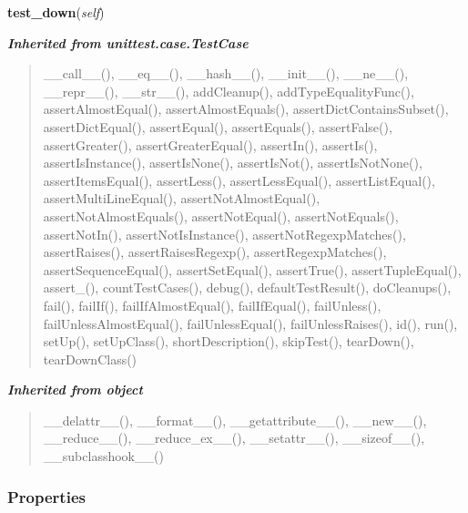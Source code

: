     \vspace{0.5ex}

\hspace{.8\funcindent}\begin{boxedminipage}{\funcwidth}

    \raggedright \textbf{test\_down}(\textit{self})

\setlength{\parskip}{2ex}
\setlength{\parskip}{1ex}
    \end{boxedminipage}


\large{\textbf{\textit{Inherited from unittest.case.TestCase}}}

\begin{quote}
\_\_call\_\_(), \_\_eq\_\_(), \_\_hash\_\_(), \_\_init\_\_(), \_\_ne\_\_(), \_\_repr\_\_(), \_\_str\_\_(), addCleanup(), addTypeEqualityFunc(), assertAlmostEqual(), assertAlmostEquals(), assertDictContainsSubset(), assertDictEqual(), assertEqual(), assertEquals(), assertFalse(), assertGreater(), assertGreaterEqual(), assertIn(), assertIs(), assertIsInstance(), assertIsNone(), assertIsNot(), assertIsNotNone(), assertItemsEqual(), assertLess(), assertLessEqual(), assertListEqual(), assertMultiLineEqual(), assertNotAlmostEqual(), assertNotAlmostEquals(), assertNotEqual(), assertNotEquals(), assertNotIn(), assertNotIsInstance(), assertNotRegexpMatches(), assertRaises(), assertRaisesRegexp(), assertRegexpMatches(), assertSequenceEqual(), assertSetEqual(), assertTrue(), assertTupleEqual(), assert\_(), countTestCases(), debug(), defaultTestResult(), doCleanups(), fail(), failIf(), failIfAlmostEqual(), failIfEqual(), failUnless(), failUnlessAlmostEqual(), failUnlessEqual(), failUnlessRaises(), id(), run(), setUp(), setUpClass(), shortDescription(), skipTest(), tearDown(), tearDownClass()
\end{quote}

\large{\textbf{\textit{Inherited from object}}}

\begin{quote}
\_\_delattr\_\_(), \_\_format\_\_(), \_\_getattribute\_\_(), \_\_new\_\_(), \_\_reduce\_\_(), \_\_reduce\_ex\_\_(), \_\_setattr\_\_(), \_\_sizeof\_\_(), \_\_subclasshook\_\_()
\end{quote}


  \subsubsection{Properties}

